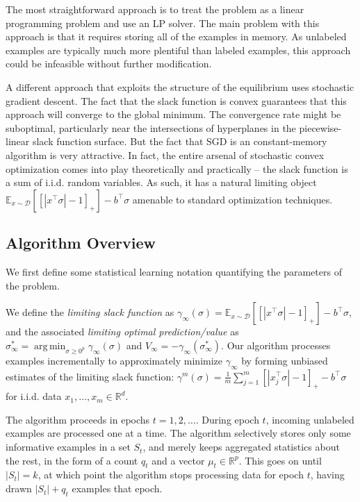 \documentclass{colt2015} %
\DeclareMathOperator*{\argmin}{arg\,min}
\newcommand{\RR}{\mathbb{R}}      %
\newcommand{\evp}[2]{\mathbb{E}_{#2} \left[#1\right]} %
\newcommand{\abs}[1]{\left| #1 \right|}
\newcommand{\cD}{\mathcal{D}}
\begin{document}
The most straightforward approach is to treat the problem as a linear
programming problem and use an LP solver. The main problem with this
approach is that it requires storing all of the examples in memory. As
unlabeled examples are typically much more plentiful than labeled
examples, this approach could be infeasible without further modification.

A different approach that exploits the structure of the equilibrium uses stochastic gradient descent. The fact
that the slack function is convex guarantees that this approach will converge to the global minimum. 
The convergence rate might be suboptimal, particularly near the intersections of hyperplanes 
in the piecewise-linear slack function surface. But the fact that SGD is an constant-memory algorithm is very attractive. 
In fact, the entire arsenal of stochastic convex optimization comes into play theoretically and practically 
-- the slack function is a sum of i.i.d. random variables. 
As such, it has a natural limiting object $\evp{\left[ \abs{x^\top \sigma} - 1 \right]_{+}}{x \sim \cD} - b^\top \sigma$ 
amenable to standard optimization techniques. 




\iffalse

\subsection{Algorithm Overview}
We first define some statistical learning notation quantifying the parameters of the problem. 

We define the \emph{limiting slack function} as 
$\gamma_\infty (\sigma) = \evp{\left[ \abs{x^\top \sigma} - 1 \right]_{+}}{x \sim \cD} - b^\top \sigma$, 
and the associated \emph{limiting optimal prediction/value} as $\sigma_{\infty}^* = \argmin_{\sigma \geq 0^p} \gamma_\infty (\sigma)$ 
and $V_{\infty} = - \gamma_\infty (\sigma_{\infty}^*)$. 
Our algorithm processes examples incrementally to approximately minimize $\gamma_\infty$ 
by forming unbiased estimates of the limiting slack function: 
$\gamma^m (\sigma) = \frac{1}{m} \sum_{j=1}^m \left[ \abs{x_{j}^\top \sigma} - 1 \right]_{+} - b^\top \sigma$ 
for i.i.d. data $x_1, \dots, x_m \in \RR^d$. 

The algorithm proceeds in epochs $t = 1, 2, \dots$. 
During epoch $t$, incoming unlabeled examples are processed one at a time. 
The algorithm selectively stores only some informative examples in a set $S_t$, 
and merely keeps aggregated statistics 
about the rest, in the form of a count $q_t$ and a vector $\mu_t \in \RR^p$. 
This goes on until $\abs{S_t} = k$, 
at which point the algorithm stops processing data for epoch $t$, 
having drawn $\abs{S_t} + q_t$ examples that epoch. 
\end{document}
